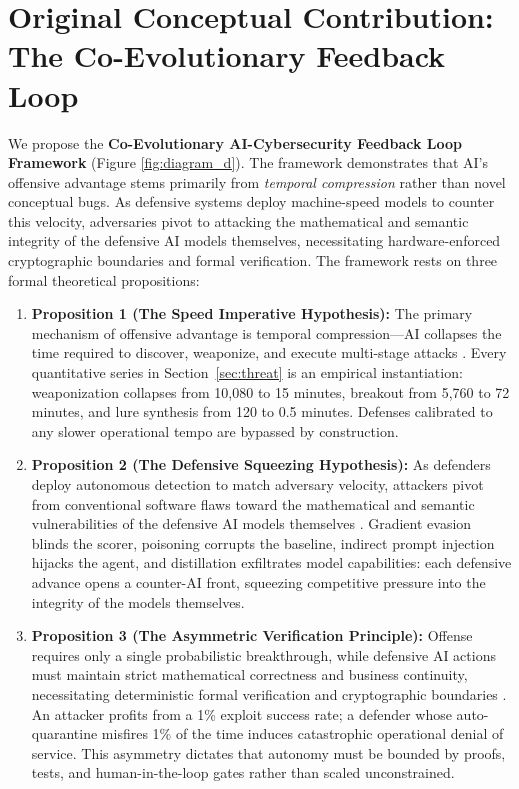 \documentclass[conference,10pt,twocolumn,a4paper]{IEEEtran}
\begin{document}
\section{Original Conceptual Contribution: The Co-Evolutionary Feedback Loop}
\label{sec:contribution}
We propose the \textbf{Co-Evolutionary AI-Cybersecurity Feedback Loop Framework} (Figure \ref{fig:diagram_d}). The framework demonstrates that AI's offensive advantage stems primarily from \emph{temporal compression} rather than novel conceptual bugs. As defensive systems deploy machine-speed models to counter this velocity, adversaries pivot to attacking the mathematical and semantic integrity of the defensive AI models themselves, necessitating hardware-enforced cryptographic boundaries and formal verification. The framework rests on three formal theoretical propositions:
\begin{enumerate}
    \item \textbf{Proposition 1 (The Speed Imperative Hypothesis):} The primary mechanism of offensive advantage is temporal compression---AI collapses the time required to discover, weaponize, and execute multi-stage attacks \cite{enisa_frontier_2026, crowdstrike_gtr_2025}. Every quantitative series in Section~\ref{sec:threat} is an empirical instantiation: weaponization collapses from 10,080 to 15 minutes, breakout from 5,760 to 72 minutes, and lure synthesis from 120 to 0.5 minutes. Defenses calibrated to any slower operational tempo are bypassed by construction.
    \item \textbf{Proposition 2 (The Defensive Squeezing Hypothesis):} As defenders deploy autonomous detection to match adversary velocity, attackers pivot from conventional software flaws toward the mathematical and semantic vulnerabilities of the defensive AI models themselves \cite{nist_sp_ai_100_2e2025, greshake2023indirect, goodfellow2015explaining}. Gradient evasion blinds the scorer, poisoning corrupts the baseline, indirect prompt injection hijacks the agent, and distillation exfiltrates model capabilities: each defensive advance opens a counter-AI front, squeezing competitive pressure into the integrity of the models themselves.
    \item \textbf{Proposition 3 (The Asymmetric Verification Principle):} Offense requires only a single probabilistic breakthrough, while defensive AI actions must maintain strict mathematical correctness and business continuity, necessitating deterministic formal verification and cryptographic boundaries \cite{cisa_agentic_ai_2026, xiang2026post, darpa_aixcc_2025}. An attacker profits from a 1\% exploit success rate; a defender whose auto-quarantine misfires 1\% of the time induces catastrophic operational denial of service. This asymmetry dictates that autonomy must be bounded by proofs, tests, and human-in-the-loop gates rather than scaled unconstrained.
\end{enumerate}
\end{document}
